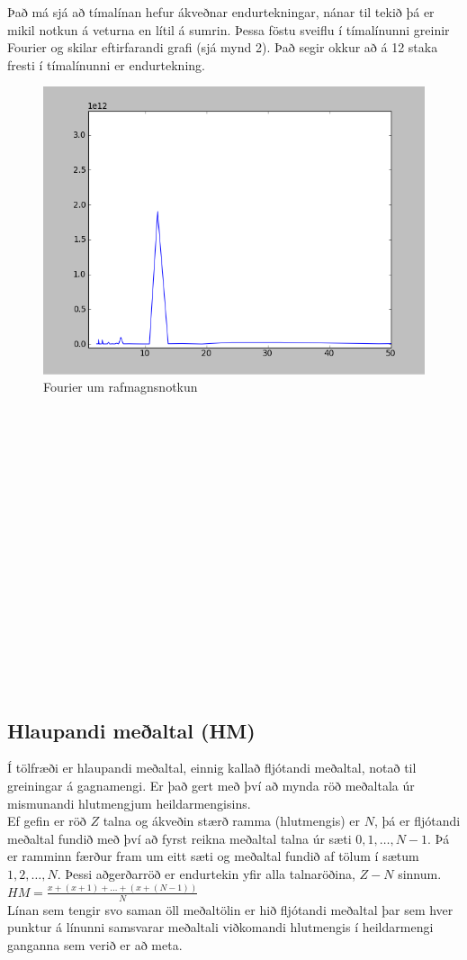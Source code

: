 \documentclass[11pt]{article}
\begin{document}
Það má sjá að tímalínan hefur ákveðnar endurtekningar, nánar til tekið þá er mikil notkun á veturna en lítil á sumrin.
Þessa föstu sveiflu í tímalínunni greinir Fourier og skilar eftirfarandi grafi (sjá mynd 2). 
Það segir okkur að á 12 staka fresti í tímalínunni er endurtekning.
\begin{figure}
 \begin{center}
 \includegraphics[width=.45\textwidth]{Fourier.png}
 \caption{Fourier um rafmagnsnotkun}
  \end{center}
\label{fig:fourier}
\end{figure}
\hfill
\\\\\\\\\\\\\\\\\\\\\\\\\\\\\\\

\subsection{Hlaupandi meðaltal (HM)}
Í tölfræði er hlaupandi meðaltal, einnig kallað fljótandi meðaltal, notað til greiningar á gagnamengi. 
Er það gert með því að mynda röð meðaltala úr mismunandi hlutmengjum heildarmengisins.\\
Ef gefin er röð $Z$ talna og ákveðin stærð ramma (hlutmengis) er $N$, þá er fljótandi meðaltal fundið með því að fyrst reikna meðaltal 
talna úr sæti $0,1,\dots,N-1$. Þá er ramminn færður fram um eitt sæti og meðaltal fundið af tölum í sætum $1,2,\dots,N$. 
Þessi aðgerðarröð er endurtekin yfir alla talnaröðina, $Z-N$ sinnum.  \\
$HM = \frac{x+(x+1)+\dots+(x+(N-1))}{N}$
\\
Línan sem tengir svo saman öll meðaltölin er hið fljótandi meðaltal þar sem hver punktur á línunni samsvarar 
meðaltali viðkomandi hlutmengis í heildarmengi ganganna sem verið er að meta. 
 
\end{document}
